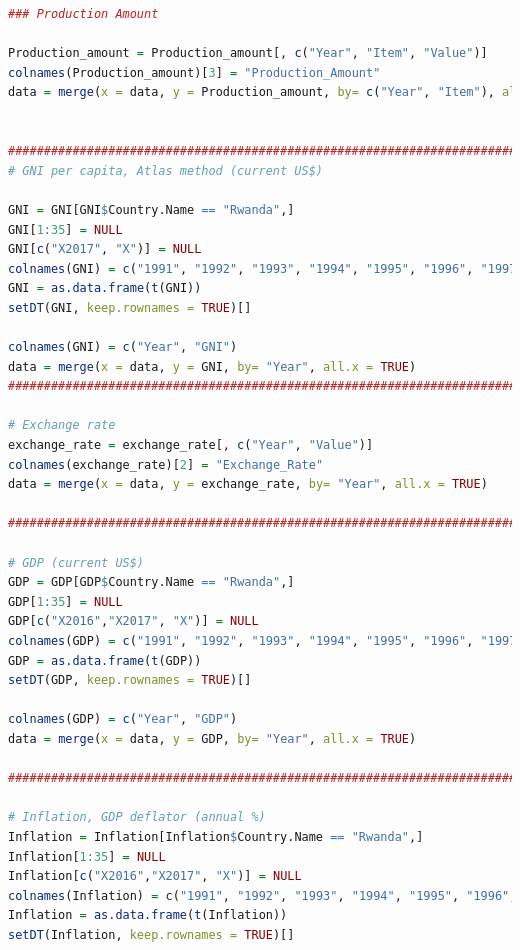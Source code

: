 \documentclass[11pt]{article}
\begin{document}
\begin{lstlisting}[language= R]
### Production Amount

Production_amount = Production_amount[, c("Year", "Item", "Value")]
colnames(Production_amount)[3] = "Production_Amount"
data = merge(x = data, y = Production_amount, by= c("Year", "Item"), all.x = TRUE)


#################################################################################################
# GNI per capita, Atlas method (current US$)

GNI = GNI[GNI$Country.Name == "Rwanda",]
GNI[1:35] = NULL
GNI[c("X2017", "X")] = NULL
colnames(GNI) = c("1991", "1992", "1993", "1994", "1995", "1996", "1997", "1998", "1999", "2000", "2001", "2002", "2003", "2004", "2005", "2006", "2007", "2008", "2009", "2010", "2011", "2012", "2013", "2014", "2015")
GNI = as.data.frame(t(GNI))
setDT(GNI, keep.rownames = TRUE)[]

colnames(GNI) = c("Year", "GNI")
data = merge(x = data, y = GNI, by= "Year", all.x = TRUE)
######################################################################################################

# Exchange rate
exchange_rate = exchange_rate[, c("Year", "Value")]
colnames(exchange_rate)[2] = "Exchange_Rate"
data = merge(x = data, y = exchange_rate, by= "Year", all.x = TRUE)

####################################################################################################

# GDP (current US$)
GDP = GDP[GDP$Country.Name == "Rwanda",]
GDP[1:35] = NULL
GDP[c("X2016","X2017", "X")] = NULL
colnames(GDP) = c("1991", "1992", "1993", "1994", "1995", "1996", "1997", "1998", "1999", "2000", "2001", "2002", "2003", "2004", "2005", "2006", "2007", "2008", "2009", "2010", "2011", "2012", "2013", "2014", "2015")
GDP = as.data.frame(t(GDP))
setDT(GDP, keep.rownames = TRUE)[]

colnames(GDP) = c("Year", "GDP")
data = merge(x = data, y = GDP, by= "Year", all.x = TRUE)

##################################################################################################

# Inflation, GDP deflator (annual %)
Inflation = Inflation[Inflation$Country.Name == "Rwanda",]
Inflation[1:35] = NULL
Inflation[c("X2016","X2017", "X")] = NULL
colnames(Inflation) = c("1991", "1992", "1993", "1994", "1995", "1996", "1997", "1998", "1999", "2000", "2001", "2002", "2003", "2004", "2005", "2006", "2007", "2008", "2009", "2010", "2011", "2012", "2013", "2014", "2015")
Inflation = as.data.frame(t(Inflation))
setDT(Inflation, keep.rownames = TRUE)[]


\end{lstlisting}
\end{document}
